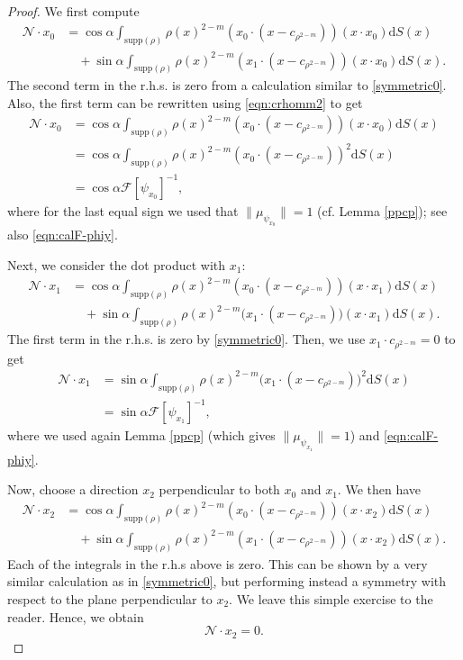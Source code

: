 \documentclass[11pt]{amsart}
\newcommand{\dx}{\mathrm{d}S (x)}
\newcommand{\supp}{\mathrm{supp}(\rho)}
\begin{document}
\begin{proof}
We first compute
\begin{align*}
\mathcal{N}\cdot x_0&=\cos\alpha\int_{\supp}\rho(x)^{2-m}\left(x_0\cdot(x-c_{\rho^{2-m}})\right)(x\cdot x_0)\dx\\[2pt]
&\quad +\sin\alpha\int_{\supp}\rho(x)^{2-m}\left(x_1\cdot(x-c_{\rho^{2-m}})\right)(x\cdot x_0)\dx.
\end{align*}
The second term in the r.h.s. is zero from a calculation similar to \eqref{symmetric0}. Also, the first term can be rewritten using \eqref{eqn:crhomm2} to get
\begin{equation}
\begin{aligned}
\label{eqn:Ndotx0}
\mathcal{N}\cdot x_0&=\cos\alpha\int_{\supp}\rho(x)^{2-m}\left(x_0\cdot(x-c_{\rho^{2-m}})\right)(x\cdot x_0)\dx\\
&=\cos\alpha\int_{\supp}\rho(x)^{2-m}\left(x_0\cdot(x-c_{\rho^{2-m}})\right)^2\dx \\
&=\cos\alpha\mathcal{F}[\psi_{x_0}]^{-1},
\end{aligned}
\end{equation}
where for the last equal sign we used that $\|\mu_{\psi_{x_0}}\|=1$ (cf. Lemma \ref{ppcp}); see also \eqref{eqn:calF-phiy}.

Next, we consider the dot product with $x_1$:
\begin{align*}
\mathcal{N}\cdot x_1&=\cos\alpha\int_{\supp}\rho(x)^{2-m}\left(x_0\cdot(x-c_{\rho^{2-m}})\right)(x\cdot x_1)\dx\\
&\quad +\sin\alpha\int_{\supp}\rho(x)^{2-m}\big(x_1\cdot (x-c_{\rho^{2-m}})\big)(x\cdot x_1)\dx.
\end{align*}
The first term in the r.h.s. is zero by \eqref{symmetric0}. Then, we use $x_1\cdot c_{\rho^{2-m}}=0$ to get
\begin{equation}
\label{eqn:Ndotx1}
\begin{aligned}
\mathcal{N}\cdot x_1 &=\sin\alpha\int_{\supp}\rho(x)^{2-m}\big(x_1\cdot (x-c_{\rho^{2-m}})\big)^2\dx\\
&=\sin\alpha\mathcal{F}[\psi_{x_1}]^{-1},
\end{aligned}
\end{equation}
where we used again Lemma \ref{ppcp} (which gives $\|\mu_{\psi_{x_1}}\|=1$) and \eqref{eqn:calF-phiy}.

Now, choose a direction $x_2$ perpendicular to both $x_0$ and $x_1$. We then have
\begin{align*}
\mathcal{N}\cdot x_2&=\cos\alpha\int_{\supp}\rho(x)^{2-m}\left(x_0\cdot(x-c_{\rho^{2-m}})\right)(x\cdot x_2)\dx\\
&\quad +\sin\alpha\int_{\supp}\rho(x)^{2-m}\left(x_1\cdot(x-c_{\rho^{2-m}})\right)(x\cdot x_2)\dx.
\end{align*}
Each of the integrals in the r.h.s above is zero. This can be shown by a very similar calculation as in \eqref{symmetric0}, but performing instead a symmetry with respect to the plane perpendicular to $x_2$. We leave this simple exercise to the reader. Hence, we obtain
\[
\mathcal{N}\cdot x_2=0.
\]


\end{proof}
\end{document}
